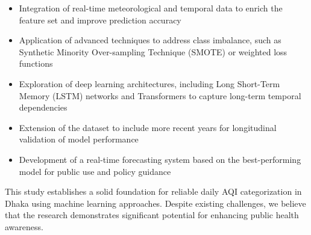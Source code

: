 \documentclass[a4paper,fleqn]{cas-dc}
\begin{document}
\begin{itemize}
    \item Integration of real-time meteorological and temporal data to enrich the feature set and improve prediction accuracy
    \item Application of advanced techniques to address class imbalance, such as Synthetic Minority Over-sampling Technique (SMOTE) or weighted loss functions
    \item Exploration of deep learning architectures, including Long Short-Term Memory (LSTM) networks and Transformers to capture long-term temporal dependencies
    \item Extension of the dataset to include more recent years for longitudinal validation of model performance
    \item Development of a real-time forecasting system based on the best-performing model for public use and policy guidance
\end{itemize}

This study establishes a solid foundation for reliable daily AQI categorization in Dhaka using machine learning approaches. Despite existing challenges, we believe that the research demonstrates significant potential for enhancing public health awareness.



\printcredits

% 
% 


%


\end{document}
